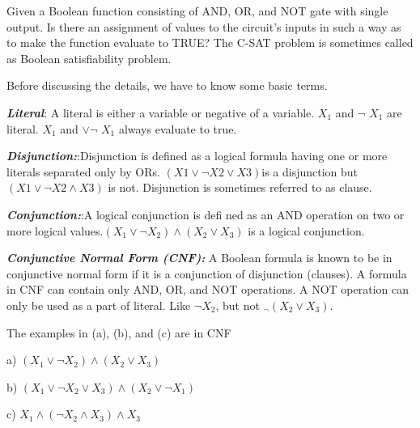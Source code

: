 \documentclass[10pt,a4paper]{book}
\begin{document}
Given a Boolean function consisting of AND, OR, and NOT gate with single output. Is there an assignment of values to the circuit’s inputs in such a way as to make the function evaluate to TRUE? The C-SAT problem is sometimes called as Boolean satisfiability problem.

Before discussing the details, we have to know some basic terms.

\!\!\!\!\!\!\!\!\!\!\!\emph{\textsf{\textbf{Literal}}}: A literal is either a variable or negative of a variable. $X_{1}$ and $\neg$ $X_{1}$ are literal. $X_{1}$ and $\vee$$\neg$ $X_{1}$ always
evaluate to true.

\!\!\!\!\!\!\!\!\!\!\!\emph{\textsf{\textbf{Disjunction:}}}:Disjunction is defined as a logical formula having one or more literals separated only by
ORs. $(X1 \vee \neg X2 \vee X3) $is a disjunction but $(X1 \vee \neg X2 \wedge X3)$ is not. Disjunction is sometimes referred to
as clause.

\!\!\!\!\!\!\!\!\!\!\!\emph{\textsf{\textbf{Conjunction:}}}:A logical conjunction is defi ned as an AND operation on two or more logical values.$(X_{1} \vee \neg X_{2}) \wedge (X_{2} \vee X_{3})$ is a logical conjunction.


\!\!\!\!\!\!\!\!\!\!\!\emph{\textsf{\textbf{Conjunctive Normal Form (CNF):}}} A Boolean formula is known to be in conjunctive normal form if it is a conjunction of disjunction (clauses). A formula in CNF can contain only AND, OR, and NOT operations.
A NOT operation can only be used as a part of literal. Like $\neg X_{2}$, but not $_{¬}(X_{2} \vee X_{3})$.

The examples in (a), (b), and (c) are in CNF

\begin{flushleft}
  a) $(X_{1} \vee \neg X_{2}) \wedge (X_{2} \vee X_{3})$
  
  b) $(X_{1} \vee \neg X_{2} \vee X_{3}) \wedge (X_{2} \vee \neg X_{1})$
  
  c) $X_{1} \wedge (\neg X_{2} \wedge X_{3}) \wedge X_{3}$
\end{flushleft}
\end{document}
